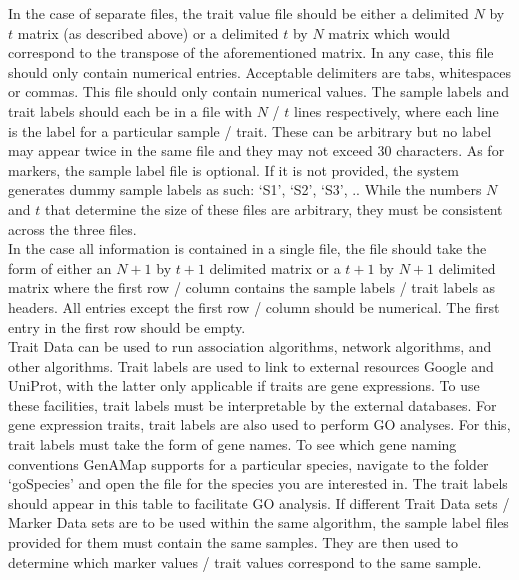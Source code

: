 \documentclass{article}
\begin{document}
In the case of separate files, the trait value file should be either a delimited $N$ by $t$ matrix (as described above) or a delimited $t$ by $N$ matrix which would correspond to the transpose of the aforementioned matrix. In any case, this file should only contain numerical entries. Acceptable delimiters are tabs, whitespaces or commas. This file should only contain numerical values. The sample labels and trait labels should each be in a file with $N$ / $t$ lines respectively, where each line is the label for a particular sample / trait. These can be arbitrary but no label may appear twice in the same file and they may not exceed 30 characters. As for markers, the sample label file is optional. If it is not provided, the system generates dummy sample labels as such: `S1', `S2', `S3', .. While the numbers $N$ and $t$ that determine the size of these files are arbitrary, they must be consistent across the three files.\\

In the case all information is contained in a single file, the file should take the form of either an $N+1$ by $t+1$ delimited matrix or a $t+1$ by $N+1$ delimited matrix where the first row / column contains the sample labels / trait labels as headers. All entries except the first row / column should be numerical. The first entry in the first row should be empty.\\

Trait Data can be used to run association algorithms, network algorithms, and other algorithms. Trait labels are used to link to external resources Google and UniProt, with the latter only applicable if traits are gene expressions. To use these facilities, trait labels must be interpretable by the external databases. For gene expression traits, trait labels are also used to perform GO analyses. For this, trait labels must take the form of gene names. To see which gene naming conventions GenAMap supports for a particular species, navigate to the folder `goSpecies' and open the file for the species you are interested in. The trait labels should appear in this table to facilitate GO analysis. If different Trait Data sets / Marker Data sets are to be used within the same algorithm, the sample label files provided for them must contain the same samples. They are then used to determine which marker values / trait values correspond to the same sample.
\end{document}
